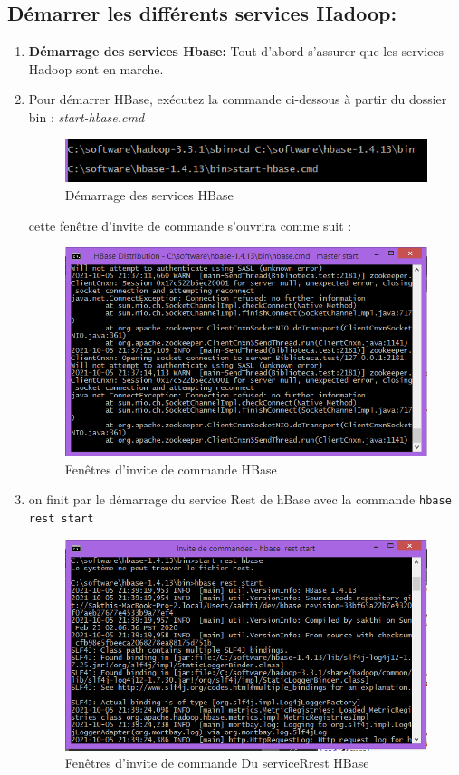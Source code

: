 \subsection{Démarrer les différents services Hadoop:}

\begin{enumerate}
\item \textbf{Démarrage des services Hbase: } Tout d'abord s'assurer que les services Hadoop sont en marche.

\item Pour démarrer HBase, exécutez la commande ci-dessous à partir du dossier bin : \textit{start-hbase.cmd}
\begin{figure}[h]
	\centering
    \includegraphics[scale=0.6]{img/part3/3.6}
    \caption{Démarrage des services HBase}
\end{figure}

\newpage
cette fenêtre d'invite de commande s'ouvrira comme suit :
\begin{figure}[h]
	\centering
    \includegraphics[scale=0.6]{img/part3/3.7}
    \caption{Fenêtres d'invite de commande HBase}
\end{figure}

\item on finit par le démarrage du service Rest de hBase avec la commande \texttt{hbase rest start}
\begin{figure}[h]
	\centering
    \includegraphics[scale=0.6]{img/part3/3.8}
    \caption{Fenêtres d'invite de commande Du serviceRrest HBase}
\end{figure}

\end{enumerate}